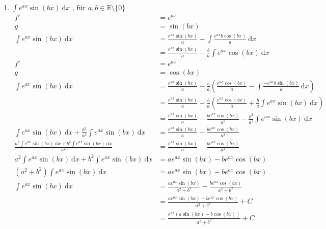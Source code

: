 \documentclass[10pt]{article}
\begin{document}
\begin{enumerate}[start=5,leftmargin=1in]
\begin{enumerate}
        \item $\int e^{ax} \sin(bx) \: \text{d}x \text{ , für } a,b \in \mathbb{R} \setminus \{0\}$
        \begin{align*}
            f' &= e^{ax} \\
            g &= \sin(bx) \\
            \int e^{ax} \sin(bx) \: \text{d}x &= \frac{e^{ax} \sin(bx)}{a} - \int \frac{e^{ax} b \cos(bx)}{a} \: \text{d}x \\
            &= \frac{e^{ax} \sin(bx)}{a} - \frac{b}{a} \int e^{ax} \cos(bx) \: \text{d}x \\
            f' &= e^{ax} \\
            g &= \cos(bx) \\
            \int e^{ax} \sin(bx) \: \text{d}x &= \frac{e^{ax} \sin(bx)}{a} - \frac{b}{a} \left(\frac{e^{ax} \cos(bx)}{a} - \int \frac{-e^{ax} b \sin(bx)}{a} \: \text{d}x\right) \\
            &= \frac{e^{ax} \sin(bx)}{a} - \frac{b}{a} \left(\frac{e^{ax} \cos(bx)}{a} + \frac{b}{a} \int e^{ax} \sin(bx) \: \text{d}x\right) \\
            &= \frac{e^{ax} \sin(bx)}{a} - \frac{be^{ax} \cos(bx)}{a^2} - \frac{b^2}{a^2} \int e^{ax} \sin(bx) \: \text{d}x \\
            \int e^{ax} \sin(bx) \: \text{d}x + \frac{b^2}{a^2} \int e^{ax} \sin(bx) \: \text{d}x &= \frac{e^{ax} \sin(bx)}{a} - \frac{be^{ax} \cos(bx)}{a^2} \\
            \frac{a^{2} \int e^{ax} \sin(bx) \: \text{d}x + b^{2} \int e^{ax} \sin(bx) \: \text{d}x}{a^2} &= \frac{e^{ax} \sin(bx)}{a} - \frac{be^{ax} \cos(bx)}{a^2} \\
            a^{2} \int e^{ax} \sin(bx) \: \text{d}x + b^{2} \int e^{ax} \sin(bx) \: \text{d}x &= a e^{ax} \sin(bx) - be^{ax} \cos(bx) \\
            (a^{2} + b^{2}) \int e^{ax} \sin(bx) \: \text{d}x &= a e^{ax} \sin(bx) - be^{ax} \cos(bx) \\
            \int e^{ax} \sin(bx) \: \text{d}x &= \frac{a e^{ax} \sin(bx)}{a^{2} + b^{2}} - \frac{be^{ax} \cos(bx)}{a^{2} + b^{2}} \\
            &= \frac{a e^{ax} \sin(bx) - be^{ax} \cos(bx)}{a^{2} + b^{2}} + C \\
            &= \frac{e^{ax} (a \sin(bx) - b \cos(bx))}{a^{2} + b^{2}} + C
        \end{align*}


\end{enumerate}
\end{enumerate}
\end{document}
